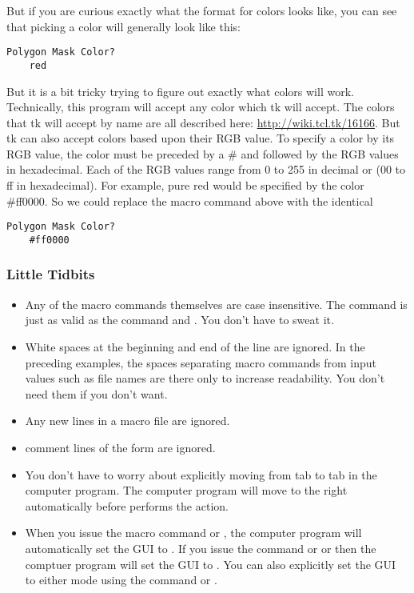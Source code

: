 But if you are curious exactly what the format for
colors looks like, you can see that picking a color
will generally look like this:
\begin{lstlisting}[caption={'Use the Folder Syntax'}]
Polygon Mask Color?
    red
\end{lstlisting}
But it is a bit tricky trying to figure out exactly what 
colors will work. Technically, this program will accept 
any color which tk will accept. The colors that tk
will accept by name are all described here:
\url{http://wiki.tcl.tk/16166}. But tk can also accept
colors based upon their RGB value. To specify a color
by its RGB value, the color must be preceded by a \#
and followed by the RGB values in hexadecimal.
Each of the RGB values range from 0 to 255 in
decimal or (00 to ff in hexadecimal).
For example, pure red would be specified by the color
\#ff0000. So we could replace the macro command above
with the identical
\begin{lstlisting}[caption={'Use the Folder Syntax'}]
Polygon Mask Color?
    #ff0000
\end{lstlisting}

\subsubsection{Little Tidbits}\label{Little Tidbits}
\begin{itemize}
    \item Any of the macro commands themselves are case
    insensitive. The command  
    is just as valid as the command 
     and 
    . You don't have to sweat it. 
    \item White spaces at the beginning and end of the 
    line are ignored. In the preceding examples, the
    spaces separating macro commands from input values
    such as file names are there only to increase 
    readability. You don't need them if you don't 
    want.
    \item Any new lines in a macro file are ignored.
    \item comment lines of the form 
     are ignored.
    \item You don't have to worry about explicitly moving 
    from tab to tab in the computer program. The computer 
    program will move to the right automatically before
    performs the action.
    \item When you issue the macro command  
    or , the computer program will
    automatically set the GUI to .
    If you issue the command or  or
     then the comptuer program
    will set the GUI to . You
    can also explicitly set the GUI to either mode using
    the command  or
    .
\end{itemize}


